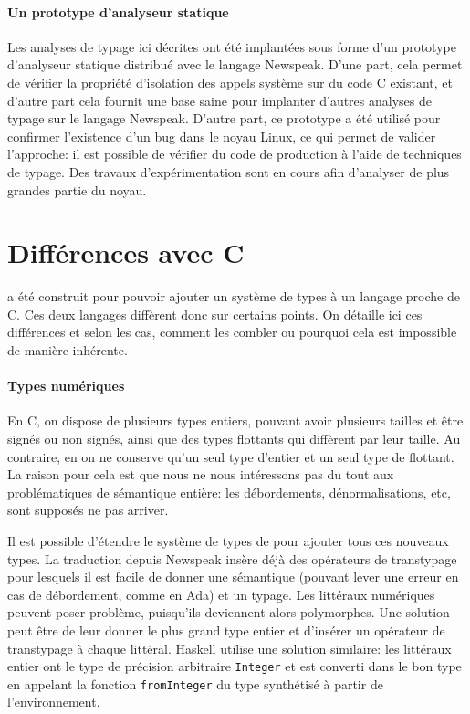 \paragraph{Un prototype d'analyseur statique}

Les analyses de typage ici décrites ont été implantées sous forme d'un prototype
d'analyseur statique distribué avec le langage Newspeak.
D'une part, cela permet de vérifier la propriété d'isolation des appels système
sur du code C existant, et d'autre part cela fournit une base saine pour
implanter d'autres analyses de typage sur le langage Newspeak.
D'autre part, ce prototype a été utilisé pour confirmer l'existence d'un bug
dans le noyau Linux, ce qui permet de valider l'approche: il est possible de
vérifier du code de production à l'aide de techniques de typage.
Des travaux d'expérimentation sont en cours afin d'analyser de plus grandes
partie du noyau.

\section{Différences avec C}

\langname a été construit pour pouvoir ajouter un système de types à un langage
proche de C. Ces deux langages diffèrent donc sur certains points. On détaille
ici ces différences et selon les cas, comment les combler ou pourquoi cela est
impossible de manière inhérente.

\paragraph{Types numériques}

En C, on dispose de plusieurs types entiers, pouvant avoir plusieurs tailles et
être signés ou non signés, ainsi que des types flottants qui diffèrent par leur
taille. Au contraire, en \langname{} on ne conserve qu'un seul type d'entier et
un seul type de flottant. La raison pour cela est que nous ne nous intéressons
pas du tout aux problématiques de sémantique entière: les débordements,
dénormalisations, etc, sont supposés ne pas arriver.

Il est possible d'étendre le système de types de \langname{} pour ajouter tous
ces nouveaux types. La traduction depuis Newspeak insère déjà des opérateurs de
transtypage pour lesquels il est facile de donner une sémantique (pouvant lever
une erreur en cas de débordement, comme en Ada) et un typage. Les littéraux
numériques peuvent poser problème, puisqu'ils deviennent alors polymorphes. Une
solution peut être de leur donner le plus grand type entier et d'insérer un
opérateur de transtypage à chaque littéral. Haskell utilise une solution
similaire: les littéraux entier ont le type de précision arbitraire
\texttt{Integer} et est converti dans le bon type en appelant la fonction
\texttt{fromInteger} du type synthétisé à partir de l'environnement.

